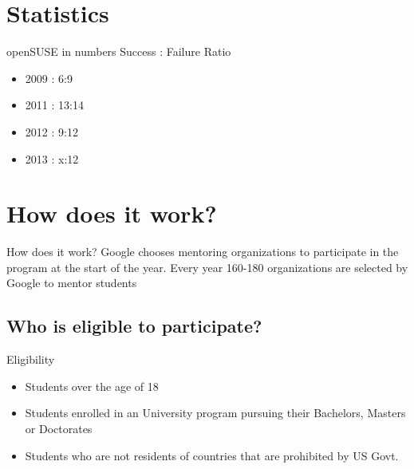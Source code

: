 \documentclass{beamer}
\begin{document}
\section{Statistics}
\begin{frame}{openSUSE in numbers}
Success : Failure Ratio
\begin{itemize}
\pause
\item 2009 : 6:9
\item 2011 : 13:14
\item 2012 : 9:12
\item 2013 : x:12
\end{itemize}
\end{frame}

\section{How does it work?}
\begin{frame}{How does it work?}
\pause
Google chooses mentoring organizations to participate in the program at the start of the year. \pause Every year 160-180 organizations are selected by Google to mentor students
\end{frame}

\subsection{Who is eligible to participate?}
\begin{frame}{Eligibility}
\pause
\begin{itemize}
\item Students over the age of 18 \pause
\item Students enrolled in an University program pursuing their Bachelors, Masters or Doctorates \pause
\item Students who are not residents of countries that are prohibited by US Govt. 
\end{itemize}
\end{frame}
\end{document}
